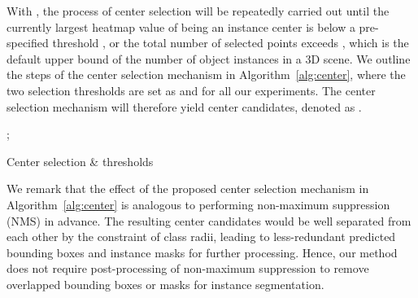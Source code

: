 \documentclass[runningheads]{llncs}
\begin{document}
With , the process of center selection will be repeatedly carried out until the currently largest heatmap value of being an instance center is below a pre-specified threshold , or the total number  of selected points exceeds , which is the default upper bound of the number of object instances in a 3D scene. We outline the steps of the center selection mechanism in Algorithm~\ref{alg:center}, where the two selection thresholds are set as  and  for all our experiments.
The center selection mechanism will therefore yield  center candidates, denoted as .





\begin{algorithm}[!t]
\DontPrintSemicolon
  
   ;  \;  
\caption{Center selection \& thresholds  }
\label{alg:center}
\end{algorithm}





We remark that the effect of the proposed center selection mechanism in Algorithm~\ref{alg:center} is analogous to performing non-maximum suppression (NMS) in advance. The resulting center candidates would be well separated from each other by the constraint of class radii, leading to less-redundant predicted bounding boxes and instance masks for further processing. Hence, our method does not require post-processing of non-maximum suppression to remove overlapped bounding boxes or masks for instance segmentation.
\end{document}
